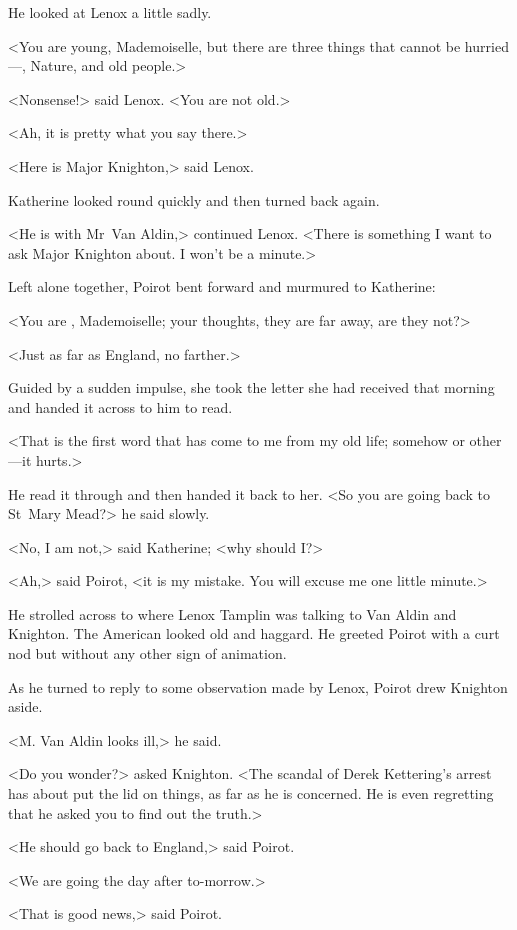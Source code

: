 He looked at Lenox a little sadly.

<You are young, Mademoiselle, but there are three things that cannot be hurried—, Nature, and old people.>

<Nonsense!> said Lenox. <You are not old.>

<Ah, it is pretty what you say there.>

<Here is Major Knighton,> said Lenox.

Katherine looked round quickly and then turned back again.

<He is with Mr~Van Aldin,> continued Lenox. <There is something I want to ask Major Knighton about. I won't be a minute.>

Left alone together, Poirot bent forward and murmured to Katherine:

<You are , Mademoiselle; your thoughts, they are far away, are they not?>

<Just as far as England, no farther.>

Guided by a sudden impulse, she took the letter she had received that morning and handed it across to him to read.

<That is the first word that has come to me from my old life; somehow or other—it hurts.>

He read it through and then handed it back to her. <So you are going back to St~Mary Mead?> he said slowly.

<No, I am not,> said Katherine; <why should I?>

<Ah,> said Poirot, <it is my mistake. You will excuse me one little minute.>

He strolled across to where Lenox Tamplin was talking to Van Aldin and Knighton. The American looked old and haggard. He greeted Poirot with a curt nod but without any other sign of animation.

As he turned to reply to some observation made by Lenox, Poirot drew Knighton aside.

<M. Van Aldin looks ill,> he said.

<Do you wonder?> asked Knighton. <The scandal of Derek Kettering's arrest has about put the lid on things, as far as he is concerned. He is even regretting that he asked you to find out the truth.>

<He should go back to England,> said Poirot.

<We are going the day after to-morrow.>

<That is good news,> said Poirot.


